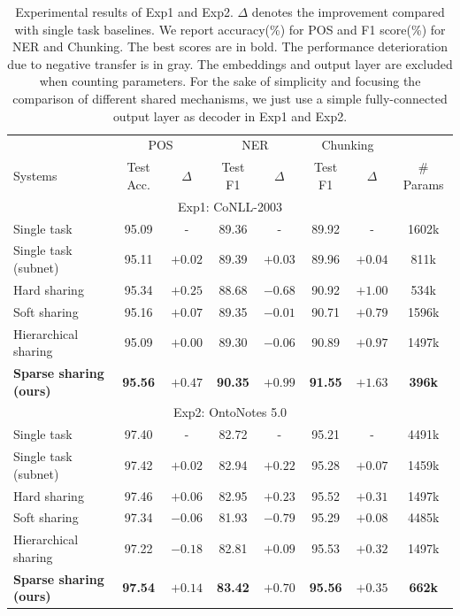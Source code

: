 \documentclass[letterpaper]{article} %
\begin{document}
\begin{table}[tbp]
\centering
\begin{tabular}{lccccccc}
	\toprule
	& \multicolumn{2}{c}{POS} & \multicolumn{2}{c}{NER} & \multicolumn{2}{c}{Chunking} &  \\
	\multirow{-2}{*}{Systems} & Test Acc. & $\Delta$ & Test F1 & $\Delta$ & Test F1 & $\Delta$ & \multirow{-2}{*}{\# Params} \\ \midrule[.5pt]
	\multicolumn{8}{c}{Exp1: CoNLL-2003} \\ \midrule[.5pt]
	Single task & 95.09 & - & 89.36 & - & 89.92 & - & 1602k \\
	Single task (subnet) & 95.11 & $+0.02$ & 89.39 & $+0.03$ & 89.96 & $+0.04$ & 811k \\
	Hard sharing & 95.34 & $+0.25$ & 88.68 & {\cellcolor[HTML]{D6D6D6} $-0.68$} & 90.92 & $+1.00$ & 534k \\
	Soft sharing & 95.16 & $+0.07$ & 89.35 & {\cellcolor[HTML]{D6D6D6} $-0.01$} & 90.71 & $+0.79$ & 1596k \\
	Hierarchical sharing & 95.09 & $+0.00$ & 89.30 & {\cellcolor[HTML]{D6D6D6} $-0.06$} & 90.89 & $+0.97$ & 1497k \\
	\textbf{Sparse sharing (ours)} & \textbf{95.56} & $+0.47$ & \textbf{90.35} & $+0.99$ & \textbf{91.55} & $+1.63$ & \textbf{396k} \\ \midrule[.5pt]
	\multicolumn{8}{c}{Exp2: OntoNotes 5.0} \\ \midrule[.5pt]
	Single task & 97.40 & - & 82.72 & - & 95.21 & - & 4491k \\
	Single task (subnet) & 97.42 & $+0.02$ & 82.94 & $+0.22$ & 95.28 & $+0.07$ & 1459k \\
	Hard sharing & 97.46 & $+0.06$ & 82.95 & $+0.23$ & 95.52 & $+0.31$ & 1497k \\
	Soft sharing & 97.34 & {\cellcolor[HTML]{D6D6D6} $-0.06$} & 81.93 & {\cellcolor[HTML]{D6D6D6} $-0.79$} & 95.29 & $+0.08$ & 4485k \\
	Hierarchical sharing & 97.22 & {\cellcolor[HTML]{D6D6D6} $-0.18$} & 82.81 & $+0.09$ & 95.53 & $+0.32$ & 1497k \\
	\textbf{Sparse sharing (ours)} & \textbf{97.54} & $+0.14$ & \textbf{83.42} & $+0.70$ & \textbf{95.56} & $+0.35$ & \textbf{662k} \\ \bottomrule
\end{tabular}
\caption{Experimental results of Exp1 and Exp2. $\Delta$ denotes the improvement compared with single task baselines. We report accuracy(\%) for POS and F1 score(\%) for NER and Chunking. The best scores are in bold. The performance deterioration due to negative transfer is in gray. The embeddings and output layer are excluded when counting parameters. For the sake of simplicity and focusing the comparison of different shared mechanisms, we just use a simple fully-connected output layer as decoder in Exp1 and Exp2.
}
\label{tb:main_results}
\end{table}
\end{document}
